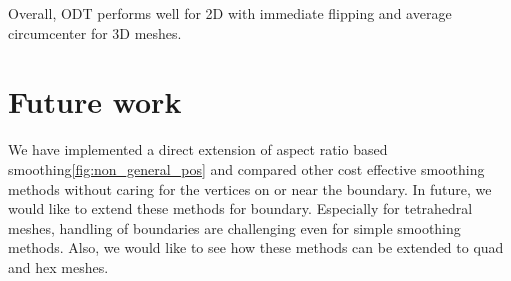 Overall, ODT performs well for 2D with immediate flipping and average circumcenter for 3D meshes.

\section{Future work}
We have implemented a direct extension of aspect ratio based smoothing\ref{fig:non_general_pos} and compared other cost effective smoothing methods without caring for the vertices on or near the boundary. In future, we would like to extend these methods for boundary. Especially for tetrahedral meshes, handling of boundaries are challenging even for simple smoothing methods. Also, we would like to see how these methods can be extended to quad and hex meshes.